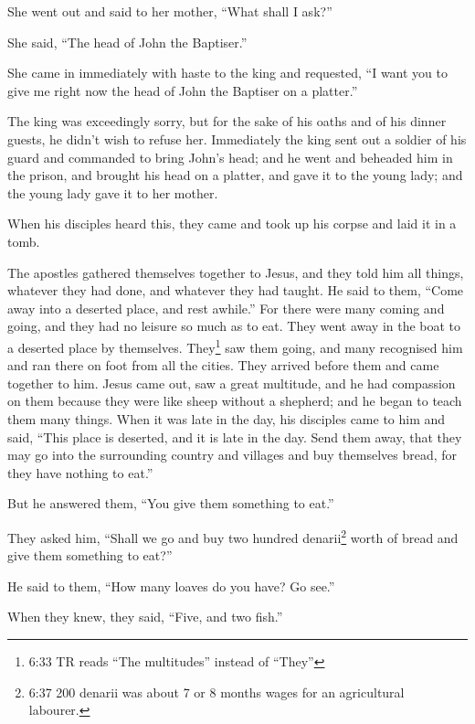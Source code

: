  She went out and said to her mother, ``What shall I ask?''

She said, ``The head of John the Baptiser.''

 She came in immediately with haste to the king and
requested, ``I want you to give me right now the head of John the
Baptiser on a platter.''

 The king was exceedingly sorry, but for the sake of his
oaths and of his dinner guests, he didn't wish to refuse her.
 Immediately the king sent out a soldier of his guard and
commanded to bring John's head; and he went and beheaded him in the
prison,  and brought his head on a platter, and gave it to
the young lady; and the young lady gave it to her mother.

 When his disciples heard this, they came and took up his
corpse and laid it in a tomb.

 The apostles gathered themselves together to Jesus, and
they told him all things, whatever they had done, and whatever they had
taught.  He said to them, ``Come away into a deserted
place, and rest awhile.'' For there were many coming and going, and they
had no leisure so much as to eat.  They went away in the
boat to a deserted place by themselves.  They\footnote{6:33
  TR reads ``The multitudes'' instead of ``They''} saw them going, and
many recognised him and ran there on foot from all the cities. They
arrived before them and came together to him.  Jesus came
out, saw a great multitude, and he had compassion on them because they
were like sheep without a shepherd; and he began to teach them many
things.  When it was late in the day, his disciples came to
him and said, ``This place is deserted, and it is late in the day.
 Send them away, that they may go into the surrounding
country and villages and buy themselves bread, for they have nothing to
eat.''

 But he answered them, ``You give them something to eat.''

They asked him, ``Shall we go and buy two hundred denarii\footnote{6:37
  200 denarii was about 7 or 8 months wages for an agricultural
  labourer.} worth of bread and give them something to eat?''

 He said to them, ``How many loaves do you have? Go see.''

When they knew, they said, ``Five, and two fish.''

